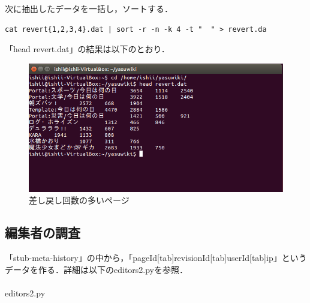 次に抽出したデータを一括し，ソートする．

{\small
\begin{verbatim}
cat revert{1,2,3,4}.dat | sort -r -n -k 4 -t "  " > revert.da
\end{verbatim}}

「head revert.dat」の結果は以下のとおり．

\begin{figure}[H]
\centering
\includegraphics[width=14cm]{head_revert.png}
\caption{差し戻し回数の多いページ}\label{サンプル図}
\end{figure}


\clearpage

\subsection{編集者の調査}

「stub-meta-history」の中から，「pageId[tab]revisionId[tab]userId[tab]ip」というデータを作る．詳細は以下のeditors2.pyを参照． \\
\\
editors2.py

